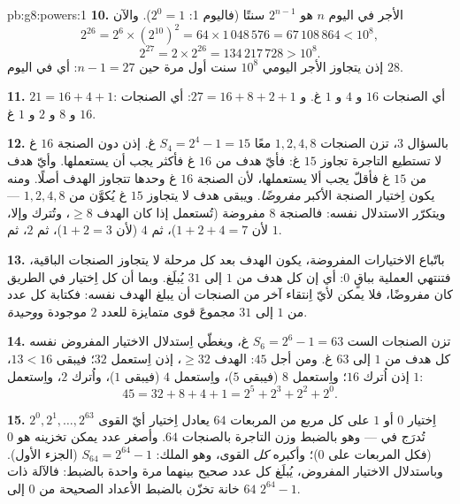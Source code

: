 \begin{solution}{pb:g8:powers:1}
\textbf{10.} الأجر في اليوم $n$ هو $2^{n-1}$ سنتًا (فاليوم 1:
$2^0 = 1$). والآن
\[
2^{26} = 2^6 \times \left(2^{10}\right)^2
= 64 \times 1\,048\,576 = 67\,108\,864 < 10^8,
\]
\[
2^{27} = 2 \times 2^{26} = 134\,217\,728 > 10^8 .
\]
إذن يتجاوز الأجر اليومي $10^8$ سنت أول مرة حين $n - 1 = 27$:
أي في اليوم $28$.

\textbf{11.} $21 = 16 + 4 + 1$: أي الصنجات $16$ و $4$ و $1$ غ.
و $27 = 16 + 8 + 2 + 1$: أي الصنجات $16$ و $8$ و $2$ و $1$ غ.

\textbf{12.} بالسؤال 3، تزن الصنجات $1, 2, 4, 8$ معًا
$S_4 = 2^4 - 1 = 15$ غ. إذن دون الصنجة $16$ غ لا تستطيع
التاجرة تجاوز $15$ غ: فأيّ هدف من $16$ غ فأكثر يجب أن
يستعملها. وأيّ هدف من $15$ غ فأقلّ يجب ألا يستعملها، لأن
الصنجة $16$ غ وحدها تتجاوز الهدف أصلًا. ومنه يكون اِختيار
الصنجة الأكبر \emph{مفروضًا}. ويبقى
هدف لا يتجاوز $15$ غ يُكوَّن من $1, 2, 4, 8$ ---
ويتكرّر الاستدلال نفسه: فالصنجة $8$ مفروضة (تُستعمل إذا كان الهدف
 $\geq 8$، وتُترك وإلا، لأن $1 + 2 + 4 = 7$)،
ثم $4$ (لأن $1 + 2 = 3$)، ثم $2$، ثم $1$.

\textbf{13.} باتّباع الاختيارات المفروضة، يكون الهدف 
بعد كل مرحلة لا يتجاوز  الصنجات الباقية،
فتنتهي العملية بباقٍ $0$: أي إن كل هدف من $1$ إلى
$31$ يُبلَغ. وبما أن كل اِختيار في الطريق كان مفروضًا،
فلا يمكن لأيّ اِنتقاء آخر من الصنجات أن يبلغ الهدف نفسه: فكتابة
كل عدد من $1$ إلى $31$ مجموعَ قوى متمايزة
للعدد $2$ موجودة و\emph{وحيدة}.

\textbf{14.} تزن الصنجات الست $S_6 = 2^6 - 1 = 63$ غ،
ويغطّي اِستدلال الاختيار المفروض نفسه كل هدف من $1$ إلى
$63$ غ. ومن أجل $45$: الهدف $\geq 32$، إذن اِستعمل $32$؛ فيبقى
$13 < 16$، إذن اُترك $16$؛ واِستعمل $8$ (فيبقى $5$)، واِستعمل $4$ (فيبقى
$1$)، واُترك $2$، واِستعمل $1$:
\[
45 = 32 + 8 + 4 + 1 = 2^5 + 2^3 + 2^2 + 2^0 .
\]

\textbf{15.} اِختيار $0$ أو $1$ على كل مربع من المربعات $64$
يعادل اِختيار أيّ القوى $2^0, 2^1, \dots, 2^{63}$ تُدرَج
في  --- وهو بالضبط وزن التاجرة بالصنجات $64$.
وأصغر عدد يمكن تخزينه هو $0$ (فكل المربعات على
$0$)؛ وأكبره  \emph{كل} القوى، وهو
 الملك: $S_{64} = 2^{64} - 1$ (الجزء الأول). وباستدلال
الاختيار المفروض، يُبلَغ كل عدد صحيح بينهما
مرة واحدة بالضبط: فالآلة ذات $64$ خانة تخزّن بالضبط الأعداد
الصحيحة من $0$ إلى $2^{64} - 1$.
\end{solution}
